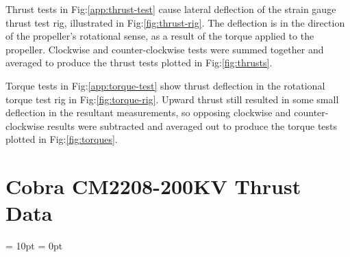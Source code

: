 Thrust tests in Fig:\ref{app:thrust-test} cause lateral deflection of the strain gauge thrust test rig, illustrated in Fig:\ref{fig:thrust-rig}. The deflection is in the direction of the propeller's rotational sense, as a result of the torque applied to the propeller. Clockwise and counter-clockwise tests were summed together and averaged to produce the thrust tests plotted in Fig:\ref{fig:thrusts}.
\par
Torque tests in Fig:\ref{app:torque-test} show thrust deflection in the rotational torque test rig in Fig:\ref{fig:torque-rig}. Upward thrust still resulted in some small deflection in the resultant measurements, so opposing clockwise and counter-clockwise results were subtracted and averaged out to produce the torque tests plotted in Fig:\ref{fig:torques}.
\newpage
\section{Cobra CM2208-200KV Thrust Data}
\label{app:cobra-test}
\centering
{}
\restoregeometry
\newpage
\justifying
\parskip	= 10pt						%
\parindent 	= 0pt						%
\newpage
